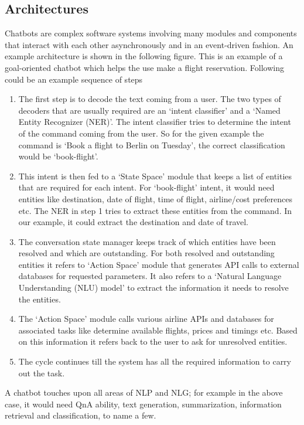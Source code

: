 \documentclass[]{krantz}
\begin{document}
\hypertarget{architectures}{%
\subsection{Architectures}\label{architectures}}

Chatbots are complex software systems involving many modules and components that interact with each other asynchronously and in an event-driven fashion. An example architecture is shown in the following figure. This is an example of a goal-oriented chatbot which helps the use make a flight reservation. Following could be an example sequence of steps

\begin{enumerate}
\def\labelenumi{\arabic{enumi}.}
\item
  The first step is to decode the text coming from a user. The two types of decoders that are usually required are an `intent classifier' and a `Named Entity Recognizer (NER)'. The intent classifier tries to determine the intent of the command coming from the user. So for the given example the command is `Book a flight to Berlin on Tuesday', the correct classification would be `book-flight'.
\item
  This intent is then fed to a `State Space' module that keeps a list of entities that are required for each intent. For `book-flight' intent, it would need entities like destination, date of flight, time of flight, airline/cost preferences etc. The NER in step 1 tries to extract these entities from the command. In our example, it could extract the destination and date of travel.
\item
  The conversation state manager keeps track of which entities have been resolved and which are outstanding. For both resolved and outstanding entities it refers to `Action Space' module that generates API calls to external databases for requested parameters. It also refers to a `Natural Language Understanding (NLU) model' to extract the information it needs to resolve the entities.
\item
  The `Action Space' module calls various airline APIs and databases for associated tasks like determine available flights, prices and timings etc. Based on this information it refers back to the user to ask for unresolved entities.
\item
  The cycle continues till the system has all the required information to carry out the task.
\end{enumerate}

A chatbot touches upon all areas of NLP and NLG; for example in the above case, it would need QnA ability, text generation, summarization, information retrieval and classification, to name a few.
\end{document}
